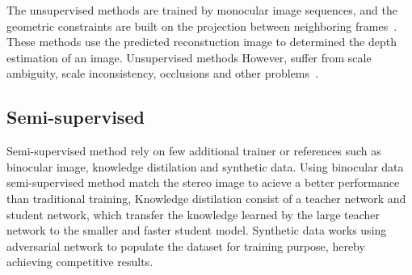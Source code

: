 \documentclass[a4paper,10pt]{article}
\begin{document}
The unsupervised methods are trained by monocular image sequences, and the geometric constraints are built on the projection between neighboring frames~\cite{Zhao2020MDEDLOverview}.
These methods use the predicted reconstuction image to determined the depth estimation of an image.
Unsupervised methods However, suffer from scale ambiguity, scale inconsistency, occlusions and other problems~\cite{Zhao2020MDEDLOverview}.

\subsection{Semi-supervised}

Semi-supervised method rely on few additional trainer or references such as binocular image, knowledge distilation and synthetic data.
Using binocular data semi-supervised method match the stereo image to acieve a better performance than traditional training, 
Knowledge distilation consist of a teacher network and student network, which transfer the knowledge learned by the large teacher network to the smaller and faster student model.
Synthetic data works using adversarial network to populate the dataset for training purpose, hereby achieving competitive results.
\printbibliography{}
\end{document}
